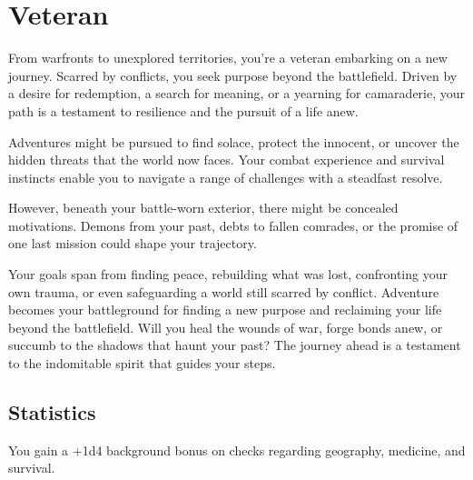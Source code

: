 \section{Veteran}\label{background:veteran}
From warfronts to unexplored territories, you're a veteran embarking on a new journey.
Scarred by conflicts, you seek purpose beyond the battlefield.
Driven by a desire for redemption, a search for meaning, or a yearning for camaraderie, your path is a testament to resilience and the pursuit of a life anew.

Adventures might be pursued to find solace, protect the innocent, or uncover the hidden threats that the world now faces.
Your combat experience and survival instincts enable you to navigate a range of challenges with a steadfast resolve.

However, beneath your battle-worn exterior, there might be concealed motivations.
Demons from your past, debts to fallen comrades, or the promise of one last mission could shape your trajectory.

Your goals span from finding peace, rebuilding what was lost, confronting your own trauma, or even safeguarding a world still scarred by conflict.
Adventure becomes your battleground for finding a new purpose and reclaiming your life beyond the battlefield.
Will you heal the wounds of war, forge bonds anew, or succumb to the shadows that haunt your past?
The journey ahead is a testament to the indomitable spirit that guides your steps.

\subsection{Statistics}
You gain a +1d4 background bonus on checks regarding geography, medicine, and survival.
